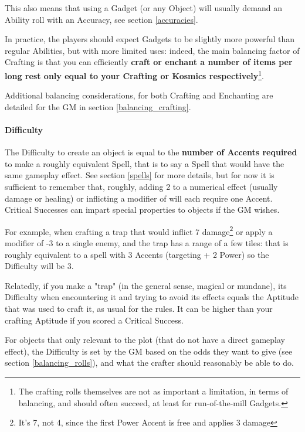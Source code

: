 This also means that using a Gadget (or any Object) will usually demand an Ability roll with an Accuracy, see section \ref{accuracies}.

In practice, the players should expect Gadgets to be slightly more powerful than regular Abilities, but with more limited uses: indeed, the main balancing factor of Crafting is that you can efficiently \textbf{craft or enchant a number of items per long rest only equal to your Crafting or Kosmics respectively}\footnote{The crafting rolls themselves are not as important a limitation, in terms of balancing, and should often succeed, at least for run-of-the-mill Gadgets.}. 


Additional balancing considerations, for both Crafting and Enchanting are detailed for the GM in section \ref{balancing_crafting}.


\paragraph{Difficulty} 

The Difficulty to create an object is equal to the \textbf{number of Accents required} to make a roughly equivalent Spell, that is to say a Spell that would have the same gameplay effect. See section \ref{spells} for more details, but for now it is sufficient to remember that, roughly, adding 2 to a numerical effect (usually damage or healing) or inflicting a modifier of  will each require one Accent. Critical Successes can impart special properties to objects if the GM wishes.

For example, when crafting a trap that would inflict 7 damage\footnote{It's 7, not 4, since the first Power Accent is free and applies 3 damage} or apply a modifier of -3 to a single enemy, and the trap has a range of a few tiles: that is roughly equivalent to a spell with 3 Accents (targeting + 2 Power) so the Difficulty will be 3.

Relatedly, if you make a "trap" (in the general sense, magical or mundane), its Difficulty when encountering it and trying to avoid its effects equals the Aptitude that was used to craft it, as usual for the rules. It can be higher than your crafting Aptitude if you scored a Critical Success. 

For objects that only relevant to the plot (that do not have a direct gameplay effect), the Difficulty is set by the GM based on the odds they want to give (see section \ref{balancing_rolls}), and what the crafter should reasonably be able to do. 

